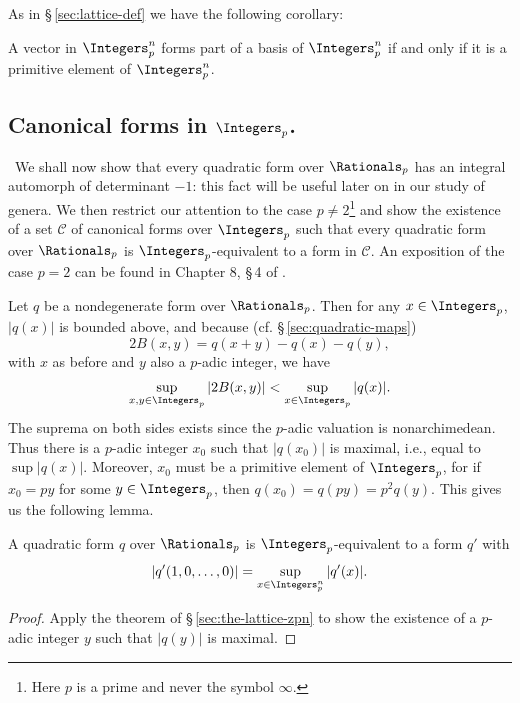 As in \S\,\ref{sec:lattice-def} we have the following corollary:

\begin{corollary}
    A vector in \(\Integers_p^n\) forms part of a basis of \(\Integers_p^n\) if
    and only if it is a primitive element of \(\Integers_p^n\).
\end{corollary}

\subsection{Canonical forms in \(\Integers_p\).}~We shall now show that every
quadratic form over \(\Rationals_p\) has an integral automorph of determinant
\(-1\): this fact will be useful later on in our study of genera. We then
restrict our attention to the case \(p \neq 2\)\footnote{Here \(p\) is a prime
and never the symbol \(\infty\).} and show the existence of a set
\(\mathcal{C}\) of canonical forms over \(\Integers_p\) such that every
quadratic form over \(\Rationals_p\) is \(\Integers_p\)-equivalent to a form in
\(\mathcal{C}\). An exposition of the case \(p = 2\) can be found in Chapter 8,
\S\,4 of \cite{cassels2008rational}.\label{sec:canonical-forms-zp}

Let \(q\) be a nondegenerate form over \(\Rationals_p\). Then for any \(x \in
\Integers_p\), \(|q(x)|\) is bounded above, and because (cf.
\S\,\ref{sec:quadratic-maps})
\[
    2B(x, y) = q(x+y) - q(x) - q(y),
\]
with \(x\) as before and \(y\) also a \(p\)-adic integer, we have
\[
    \sup_{x, y \in \Integers_p} |2B(x, y)| < \sup_{x \in \Integers_p} |q(x)|.
\]
The suprema on both sides exists since the \(p\)-adic valuation is
nonarchimedean. Thus there is a \(p\)-adic integer \(x_0\) such that
\(|q(x_0)|\) is maximal, i.e., equal to \(\sup |q(x)|\). Moreover, \(x_0\) must
be a primitive element of \(\Integers_p\), for if \(x_0 = py\) for some \(y \in
\Integers_p\), then \(q(x_0) = q(py) = p^2 q(y)\). This gives us the following
lemma.

\begin{lemmax}\label{lemma:q-primitive} A quadratic form \(q\) over
    \(\Rationals_p\) is \(\Integers_p\)-equivalent to a form \(q'\) with
    \[
        |q'(1, 0, \dots, 0)| = \sup_{x \in \Integers_p^n} |q'(x)|.
    \]
\end{lemmax}

\begin{proof}
    Apply the theorem of \S\,\ref{sec:the-lattice-zpn} to show the existence of
    a \(p\)-adic integer \(y\) such that \(|q(y)|\) is maximal.
\end{proof}

